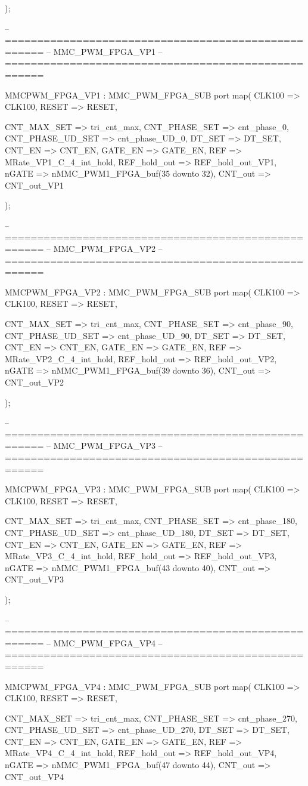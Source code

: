 \begin{mylisting}[language=VHDL,caption=ゲート信号出力モジュール,label=MMC_PWM_GEN_module_VHDL]
			);



-- ====================================================
-- MMC_PWM_FPGA_VP1
-- ====================================================

	MMCPWM_FPGA_VP1 : MMC_PWM_FPGA_SUB
		port map(
		CLK100				=> CLK100,
		RESET					=> RESET,
		
		CNT_MAX_SET			=> tri_cnt_max,
		CNT_PHASE_SET		=> cnt_phase_0,
		CNT_PHASE_UD_SET	=> cnt_phase_UD_0,
		DT_SET				=> DT_SET,
		CNT_EN				=> CNT_EN,
		GATE_EN				=> GATE_EN,
		REF					=> MRate_VP1_C_4_int_hold,
		REF_hold_out		=> REF_hold_out_VP1,
		nGATE					=> nMMC_PWM1_FPGA_buf(35 downto 32),
		CNT_out				=> CNT_out_VP1

			);


-- ====================================================
-- MMC_PWM_FPGA_VP2
-- ====================================================

	MMCPWM_FPGA_VP2 : MMC_PWM_FPGA_SUB
		port map(
		CLK100				=> CLK100,
		RESET					=> RESET,
		
		CNT_MAX_SET			=> tri_cnt_max,
		CNT_PHASE_SET		=> cnt_phase_90,
		CNT_PHASE_UD_SET	=> cnt_phase_UD_90,
		DT_SET				=> DT_SET,
		CNT_EN				=> CNT_EN,
		GATE_EN				=> GATE_EN,
		REF					=> MRate_VP2_C_4_int_hold,
		REF_hold_out		=> REF_hold_out_VP2,
		nGATE					=> nMMC_PWM1_FPGA_buf(39 downto 36),
		CNT_out				=> CNT_out_VP2

			);


-- ====================================================
-- MMC_PWM_FPGA_VP3
-- ====================================================

	MMCPWM_FPGA_VP3 : MMC_PWM_FPGA_SUB
		port map(
		CLK100				=> CLK100,
		RESET					=> RESET,
		
		CNT_MAX_SET			=> tri_cnt_max,
		CNT_PHASE_SET		=> cnt_phase_180,
		CNT_PHASE_UD_SET	=> cnt_phase_UD_180,
		DT_SET				=> DT_SET,
		CNT_EN				=> CNT_EN,
		GATE_EN				=> GATE_EN,
		REF					=> MRate_VP3_C_4_int_hold,
		REF_hold_out		=> REF_hold_out_VP3,
		nGATE					=> nMMC_PWM1_FPGA_buf(43 downto 40),
		CNT_out				=> CNT_out_VP3

			);

-- ====================================================
-- MMC_PWM_FPGA_VP4
-- ====================================================

	MMCPWM_FPGA_VP4 : MMC_PWM_FPGA_SUB
		port map(
		CLK100				=> CLK100,
		RESET					=> RESET,
		
		CNT_MAX_SET			=> tri_cnt_max,
		CNT_PHASE_SET		=> cnt_phase_270,
		CNT_PHASE_UD_SET	=> cnt_phase_UD_270,
		DT_SET				=> DT_SET,
		CNT_EN				=> CNT_EN,
		GATE_EN				=> GATE_EN,
		REF					=> MRate_VP4_C_4_int_hold,
		REF_hold_out		=> REF_hold_out_VP4,
		nGATE					=> nMMC_PWM1_FPGA_buf(47 downto 44),
		CNT_out				=> CNT_out_VP4


\end{mylisting}
